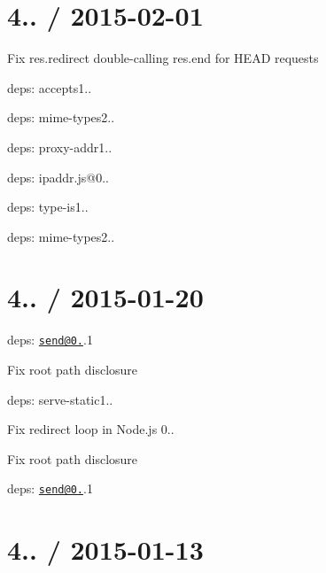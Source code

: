 \section*{4.. / 2015-\/02-\/01 }


\begin{DoxyItemize}
\item Fix {\ttfamily res.\+redirect} double-\/calling {\ttfamily res.\+end} for {\ttfamily H\+E\+A\+D} requests
\item deps\+: accepts1..
\begin{DoxyItemize}
\item deps\+: mime-\/types2..
\end{DoxyItemize}
\item deps\+: proxy-\/addr1..
\begin{DoxyItemize}
\item deps\+: ipaddr.\+js@0..
\end{DoxyItemize}
\item deps\+: type-\/is1..
\begin{DoxyItemize}
\item deps\+: mime-\/types2..
\end{DoxyItemize}
\end{DoxyItemize}

\section*{4.. / 2015-\/01-\/20 }


\begin{DoxyItemize}
\item deps\+: \href{mailto:send@0.11}{\tt send@0.}.1
\begin{DoxyItemize}
\item Fix root path disclosure
\end{DoxyItemize}
\item deps\+: serve-\/static1..
\begin{DoxyItemize}
\item Fix redirect loop in Node.\+js 0..
\item Fix root path disclosure
\item deps\+: \href{mailto:send@0.11}{\tt send@0.}.1
\end{DoxyItemize}
\end{DoxyItemize}

\section*{4.. / 2015-\/01-\/13 }



